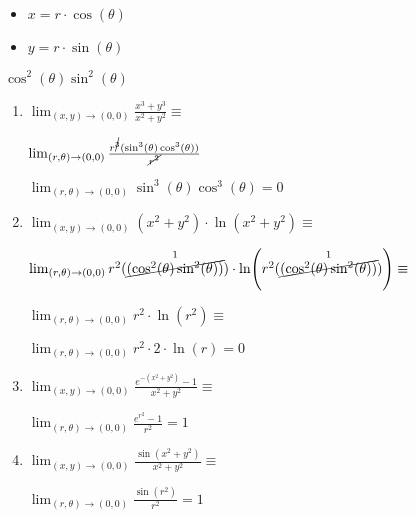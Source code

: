 \documentclass[../practica_03.tex]{subfiles}
\begin{document}
    \begin{itemize}
        \item $x = r\cdot\cos(\theta)$
        \item $y = r\cdot\sin(\theta)$
    \end{itemize}

    $ \cos^2(\theta)\sin^2(\theta) $

    \begin{enumerate}
        \item $\lim_{(x,y)\to(0,0)} \frac{x^3+y^3}{x^2+y^2} \equiv$

            $ \lim_{(r,\theta)\to(0,0)} \frac{r^{\cancel{3}}(\sin^3(\theta)\cos^3(\theta))}{\cancel{r^2}} $

            $ \lim_{(r,\theta)\to(0,0)} \sin^3(\theta)\cos^3(\theta) = 0 $

        \item $\lim_{(x,y)\to(0,0)} (x^2+y^2)\cdot\ln(x^2+y^2) \equiv$

            $ \lim_{(r,\theta)\to(0,0)} r^2(\stackrel{1}{\cancel{(\cos^2(\theta)\sin^2(\theta))}})\cdot\ln(r^2(\stackrel{1}{\cancel{(\cos^2(\theta)\sin^2(\theta))}})) \equiv $

            $ \lim_{(r,\theta)\to(0,0)} r^2\cdot\ln(r^2) \equiv $

            $ \lim_{(r,\theta)\to(0,0)} r^2\cdot 2\cdot\ln(r) = 0$

        \item $\lim_{(x,y)\to(0,0)} \frac{e^{-(x^2+y^2)}-1}{x^2+y^2} \equiv$

            $ \lim_{(r,\theta)\to(0,0)} \frac{e^{r^2}-1}{r^2} = 1 $
            
        \item $\lim_{(x,y)\to(0,0)} \frac{\sin(x^2+y^2)}{x^2+y^2} \equiv$

            $ \lim_{(r,\theta)\to(0,0)} \frac{\sin(r^2)}{r^2} = 1 $

    \end{enumerate}
\end{document}
